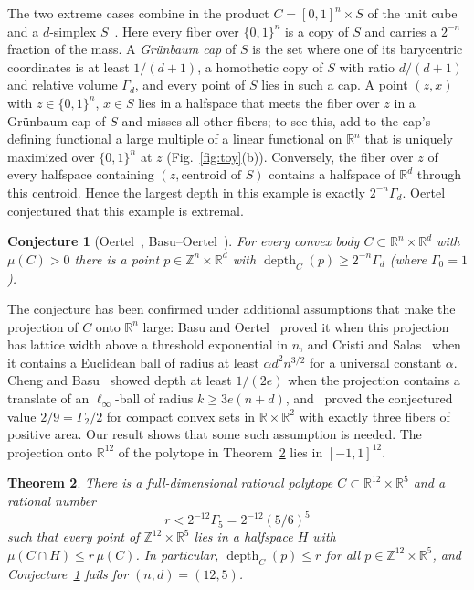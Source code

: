 \documentclass[11pt]{article}
\newtheorem{theorem}{Theorem}[section]
\newtheorem{conjecture}[theorem]{Conjecture}
\newcommand{\R}{\mathbb{R}}
\newcommand{\Z}{\mathbb{Z}}
\newcommand{\1}{\mathbf{1}}
\DeclareMathOperator{\depth}{depth}
\begin{document}
The two extreme cases combine in the product $C=[0,1]^n\times S$ of the unit cube and a $d$-simplex
$S$~\cite[Section~4.1, after Conjecture~4.1.20]{oertel}. Here every fiber over $\{0,1\}^n$ is a copy of $S$ and carries a
$2^{-n}$ fraction of the mass. A \emph{Gr\"unbaum cap} of $S$ is the set where one of its barycentric coordinates is at
least $1/(d+1)$, a homothetic copy of $S$ with ratio $d/(d+1)$ and relative volume $\Gamma_d$, and every point of $S$ lies
in such a cap. A point $(z,x)$ with $z\in\{0,1\}^n$, $x\in S$ lies in a halfspace that meets the fiber over $z$ in a
Gr\"unbaum cap of $S$ and misses all other fibers; to see this, add to the cap's defining functional a large multiple of a
linear functional on $\R^n$ that is uniquely maximized over $\{0,1\}^n$ at $z$ (Fig.~\ref{fig:toy}(b)). Conversely, the
fiber over $z$ of every halfspace containing $(z,\text{centroid of }S)$ contains a halfspace of $\R^d$ through this
centroid. Hence the largest depth in this example is exactly $2^{-n}\Gamma_d$. Oertel conjectured that this example is
extremal.

\begin{conjecture}[{Oertel~\cite[Conjecture~4.1.20]{oertel}, Basu--Oertel~\cite[Conjecture~3.5]{basu-oertel}}]\label{conj:oertel}
For every convex body $C\subset\R^n\times\R^d$ with $\mu(C)>0$ there is a point $p\in\Z^n\times\R^d$ with
$\depth_C(p)\ge2^{-n}\Gamma_d$ (where $\Gamma_0=1$).
\end{conjecture}

The conjecture has been confirmed under additional assumptions that make the projection of $C$ onto $\R^n$ large: Basu and
Oertel~\cite[Theorem~3.6]{basu-oertel} proved it when this projection has lattice width above a threshold exponential in
$n$, and Cristi and Salas~\cite[Theorem~4.5]{cristi-salas} when it contains a Euclidean ball of radius at least
$\alpha d^2n^{3/2}$ for a universal constant $\alpha$. Cheng and Basu~\cite[Corollary~2.5]{cheng-basu} showed depth at least
$1/(2e)$ when the projection contains a translate of an $\ell_\infty$-ball of radius $k\ge3e(n+d)$,
and~\cite[Theorem~1]{cheng-basu-slices} proved the conjectured value $2/9=\Gamma_2/2$ for compact convex sets in
$\R\times\R^2$ with exactly three fibers of positive area. Our result shows that some such assumption is needed. The
projection onto $\R^{12}$ of the polytope in Theorem~\ref{thm:main} lies in $[-1,1]^{12}$.

\begin{theorem}\label{thm:main}
There is a full-dimensional rational polytope $C\subset\R^{12}\times\R^5$ and a rational number
\[
r<2^{-12}\Gamma_5=2^{-12}(5/6)^5
\]
such that every point of $\Z^{12}\times\R^5$ lies in a halfspace $H$ with $\mu(C\cap H)\le r\,\mu(C)$. In particular,
$\depth_C(p)\le r$ for all $p\in\Z^{12}\times\R^5$, and Conjecture~\ref{conj:oertel} fails for $(n,d)=(12,5)$.
\end{theorem}
\end{document}
